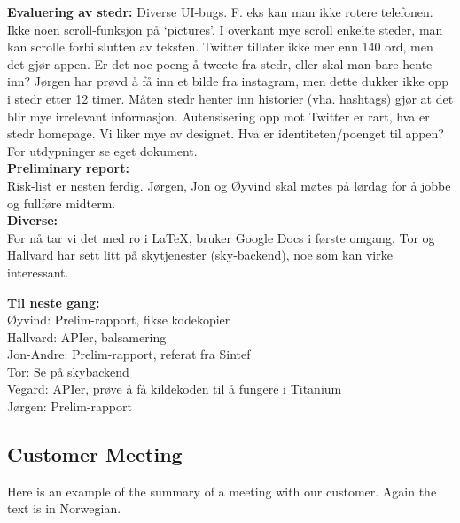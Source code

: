 \textbf{Evaluering av stedr:}
Diverse UI-bugs. F. eks kan man ikke rotere telefonen. Ikke noen scroll-funksjon på ‘pictures’. I overkant mye scroll enkelte steder, man kan scrolle forbi slutten av teksten. Twitter tillater ikke mer enn 140 ord, men det gjør appen. Er det noe poeng å tweete fra stedr, eller skal man bare hente inn? Jørgen har prøvd å få inn et bilde fra instagram, men dette dukker ikke opp i stedr etter 12 timer.
Måten stedr henter inn historier (vha. hashtags) gjør at det blir mye irrelevant informasjon. Autensisering opp mot Twitter er rart, hva er stedr homepage. Vi liker mye av designet. Hva er identiteten/poenget til appen? For utdypninger se eget dokument.\\

\textbf{Preliminary report:}\\
Risk-list er nesten ferdig. Jørgen, Jon og Øyvind skal møtes på lørdag for å jobbe og fullføre midterm.\\


\textbf{Diverse:}\\
For nå tar vi det med ro i LaTeX, bruker Google Docs i første omgang. Tor og Hallvard har sett litt på skytjenester (sky-backend), noe som kan virke interessant. \\


\textbf{Til neste gang:}\\
Øyvind: Prelim-rapport, fikse kodekopier\\
Hallvard: APIer, balsamering\\
Jon-Andre: Prelim-rapport, referat fra Sintef\\
Tor: Se på skybackend\\
Vegard: APIer, prøve å få kildekoden til å fungere i Titanium\\
Jørgen: Prelim-rapport\\

\clearpage


%

\subsection{Customer Meeting}
Here is an example of the summary of a meeting with our customer. Again the text is in Norwegian.
\clearpage
{}

